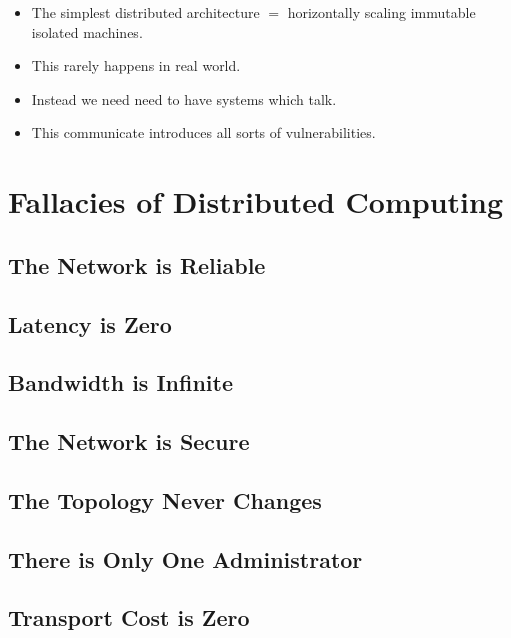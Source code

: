 \begin{itemize}
    \item The simplest distributed architecture $=$ horizontally scaling immutable isolated machines.
    \item This rarely happens in real world.
    \item Instead we need need to have systems which talk.
    \item This communicate introduces all sorts of vulnerabilities.
\end{itemize}


\section{Fallacies of Distributed Computing}
\subsection{The Network is Reliable}

\subsection{Latency is Zero}

\subsection{Bandwidth is Infinite}

\subsection{The Network is Secure}

\subsection{The Topology Never Changes}

\subsection{There is Only One Administrator}

\subsection{Transport Cost is Zero}

